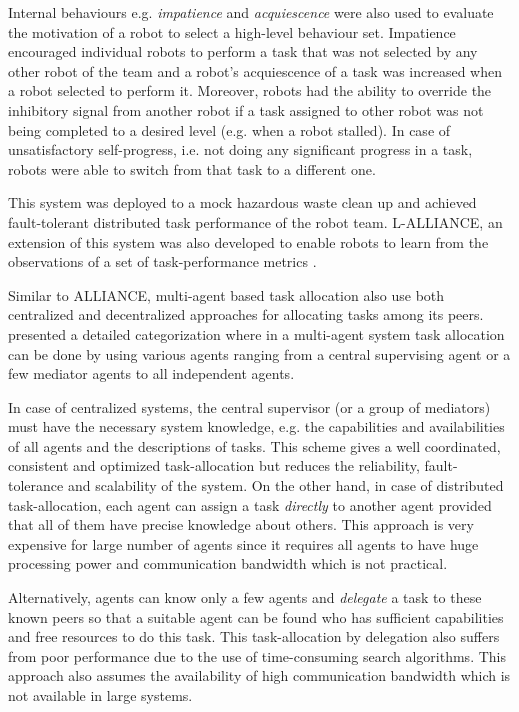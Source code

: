 Internal behaviours e.g. {\em impatience}  and {\em acquiescence} were also used to evaluate the motivation of a robot to select a high-level behaviour set.  Impatience encouraged individual robots to perform a task that was not selected by any other robot of the team and a robot's acquiescence of a task was increased when a robot selected to perform it.  Moreover, robots had the ability to override the inhibitory signal from another robot if a task assigned to other robot was not being completed to a desired level (e.g. when a robot stalled). In case of unsatisfactory self-progress, i.e. not doing any significant progress in a task, robots were able to switch from that task to a different one. 

This system was deployed to a mock hazardous waste clean up and achieved fault-tolerant distributed task performance of the robot team. L-ALLIANCE, an extension of this system was also developed to enable robots  to learn from the observations of a set of task-performance metrics \cite{Parker1995}. 

Similar to  ALLIANCE, multi-agent based task allocation also  use both centralized and decentralized approaches for allocating tasks among  its  peers.  presented a detailed categorization where in a multi-agent system task allocation can be done by using various agents ranging from a central supervising agent or a few mediator agents to  all independent agents. 

In case of centralized systems, the central supervisor (or a group of mediators)  must have the necessary system knowledge, e.g. the capabilities and availabilities of all agents and the descriptions of tasks. This scheme gives a well coordinated, consistent and optimized task-allocation but reduces  the reliability, fault-tolerance and scalability of the system. On the other hand, in case of distributed task-allocation, each agent can assign a task {\em directly} to another agent provided that all of them have precise knowledge about others. This approach is very expensive for large number of agents since it requires all agents to have huge processing power and communication bandwidth which is not practical.

Alternatively, agents can know only a few agents and {\em delegate} a task to these known peers so that a suitable agent can be found who has sufficient capabilities and free resources to do this task. This task-allocation by delegation also suffers from poor performance  due to the use of time-consuming search algorithms. This approach also assumes the availability of high communication bandwidth which is not available in large systems. 
